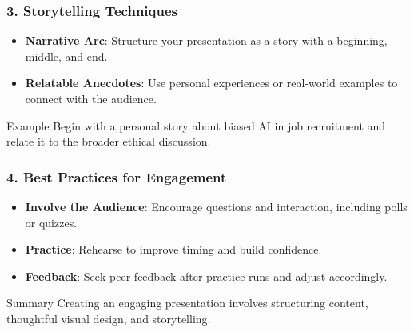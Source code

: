 \documentclass{beamer}
\begin{document}
\begin{frame}[fragile]
    \frametitle{3. Storytelling Techniques}
    \begin{itemize}
        \item \textbf{Narrative Arc}: Structure your presentation as a story with a beginning, middle, and end.
        \item \textbf{Relatable Anecdotes}: Use personal experiences or real-world examples to connect with the audience.
    \end{itemize}
    \begin{block}{Example}
        Begin with a personal story about biased AI in job recruitment and relate it to the broader ethical discussion.
    \end{block}
\end{frame}

\begin{frame}[fragile]
    \frametitle{4. Best Practices for Engagement}
    \begin{itemize}
        \item \textbf{Involve the Audience}: Encourage questions and interaction, including polls or quizzes.
        \item \textbf{Practice}: Rehearse to improve timing and build confidence.
        \item \textbf{Feedback}: Seek peer feedback after practice runs and adjust accordingly.
    \end{itemize}
    \begin{block}{Summary}
        Creating an engaging presentation involves structuring content, thoughtful visual design, and storytelling.
    \end{block}
\end{frame}
\end{document}
